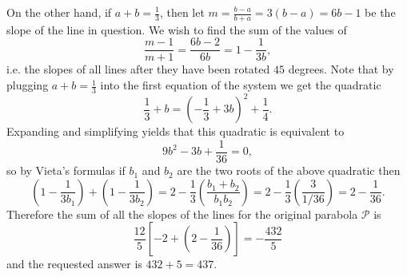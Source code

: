 \documentclass[10pt]{article}
\begin{document}
\begin{enumerate}
\par On the other hand, if $a+b=\tfrac13$, then let $m=\tfrac{b-a}{b+a}=3(b-a)=6b-1$ be the slope of the line in question.  We wish to find the sum of the values of \[\dfrac{m-1}{m+1}=\dfrac{6b-2}{6b}=1-\frac1{3b},\] i.e. the slopes of all lines after they have been rotated $45$ degrees.  Note that by plugging $a+b=\tfrac13$ into the first equation of the system we get the quadratic \[\frac13+b=\left(-\frac13+3b\right)^2+\frac14.\] Expanding and simplifying yields that this quadratic is equivalent to \[9b^2-3b+\frac1{36}=0,\] so by Vieta's formulas if $b_1$ and $b_2$ are the two roots of the above quadratic then \[\left(1-\frac1{3b_1}\right)+\left(1-\frac1{3b_2}\right) = 2-\frac13\left(\dfrac{b_1+b_2}{b_1b_2}\right)=2-\frac13\left(\frac{3}{1/36}\right) = 2-\frac1{36}.\] Therefore the sum of all the slopes of the lines for the original parabola $\mathcal{P}$ is \[\dfrac{12}5\left[-2+\left(2-\frac1{36}\right)\right]=-\frac{432}5\] and the requested answer is $432+5=\boxed{437}$.

\end{enumerate}
\end{document}
